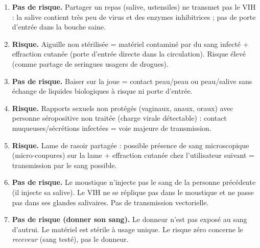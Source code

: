 \documentclass[11pt]{article}
\begin{document}
\begin{corrige}
\begin{enumerate}
\item \textbf{Pas de risque.} Partager un repas (salive, ustensiles) ne transmet pas le VIH : la salive contient très peu de virus et des enzymes inhibitrices ; pas de porte d'entrée dans la bouche saine.
\item \textbf{Risque.} Aiguille non stérilisée = matériel contaminé par du sang infecté + effraction cutanée (porte d'entrée directe dans la circulation). Risque élevé (comme partage de seringues usagers de drogues).
\item \textbf{Pas de risque.} Baiser sur la joue = contact peau/peau ou peau/salive sans échange de liquides biologiques à risque ni porte d'entrée.
\item \textbf{Risque.} Rapports sexuels non protégés (vaginaux, anaux, oraux) avec personne séropositive non traitée (charge virale détectable) : contact muqueuses/sécrétions infectées = voie majeure de transmission.
\item \textbf{Risque.} Lame de rasoir partagée : possible présence de sang microscopique (micro-coupures) sur la lame + effraction cutanée chez l'utilisateur suivant = transmission par le sang possible.
\item \textbf{Pas de risque.} Le moustique n'injecte pas le sang de la personne précédente (il injecte sa salive). Le VIH ne se réplique pas dans le moustique et ne passe pas dans ses glandes salivaires. Pas de transmission vectorielle.
\item \textbf{Pas de risque (donner son sang).} Le donneur n'est pas exposé au sang d'autrui. Le matériel est stérile à usage unique. Le risque zéro concerne le \emph{receveur} (sang testé), pas le donneur.
\end{enumerate}
\end{corrige}
\end{document}
